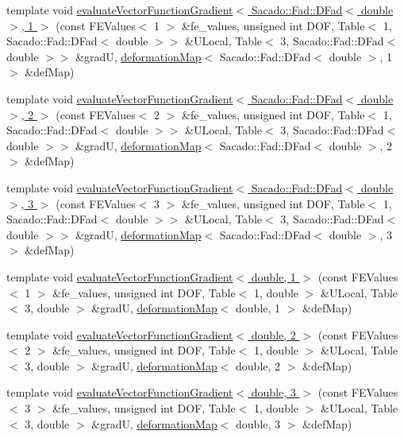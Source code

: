 \begin{DoxyCompactItemize}
\item 
template void \hyperlink{function_evaluations_8cc_a1fb7d1f43d659f0916ca96a9c951931c}{evaluate\-Vector\-Function\-Gradient$<$ Sacado\-::\-Fad\-::\-D\-Fad$<$ double $>$, 1 $>$} (const F\-E\-Values$<$ 1 $>$ \&fe\-\_\-values, unsigned int D\-O\-F, Table$<$ 1, Sacado\-::\-Fad\-::\-D\-Fad$<$ double $>$$>$ \&U\-Local, Table$<$ 3, Sacado\-::\-Fad\-::\-D\-Fad$<$ double $>$$>$ \&grad\-U, \hyperlink{structdeformation_map}{deformation\-Map}$<$ Sacado\-::\-Fad\-::\-D\-Fad$<$ double $>$, 1 $>$ \&def\-Map)
\item 
template void \hyperlink{function_evaluations_8cc_a85f7c6e4046993a83815972185df45ab}{evaluate\-Vector\-Function\-Gradient$<$ Sacado\-::\-Fad\-::\-D\-Fad$<$ double $>$, 2 $>$} (const F\-E\-Values$<$ 2 $>$ \&fe\-\_\-values, unsigned int D\-O\-F, Table$<$ 1, Sacado\-::\-Fad\-::\-D\-Fad$<$ double $>$$>$ \&U\-Local, Table$<$ 3, Sacado\-::\-Fad\-::\-D\-Fad$<$ double $>$$>$ \&grad\-U, \hyperlink{structdeformation_map}{deformation\-Map}$<$ Sacado\-::\-Fad\-::\-D\-Fad$<$ double $>$, 2 $>$ \&def\-Map)
\item 
template void \hyperlink{function_evaluations_8cc_aa336e130a0840b38bf3470c6b1133bb7}{evaluate\-Vector\-Function\-Gradient$<$ Sacado\-::\-Fad\-::\-D\-Fad$<$ double $>$, 3 $>$} (const F\-E\-Values$<$ 3 $>$ \&fe\-\_\-values, unsigned int D\-O\-F, Table$<$ 1, Sacado\-::\-Fad\-::\-D\-Fad$<$ double $>$$>$ \&U\-Local, Table$<$ 3, Sacado\-::\-Fad\-::\-D\-Fad$<$ double $>$$>$ \&grad\-U, \hyperlink{structdeformation_map}{deformation\-Map}$<$ Sacado\-::\-Fad\-::\-D\-Fad$<$ double $>$, 3 $>$ \&def\-Map)
\item 
template void \hyperlink{function_evaluations_8cc_a62dbc9fdef114b76a143e86bb1c6df96}{evaluate\-Vector\-Function\-Gradient$<$ double, 1 $>$} (const F\-E\-Values$<$ 1 $>$ \&fe\-\_\-values, unsigned int D\-O\-F, Table$<$ 1, double $>$ \&U\-Local, Table$<$ 3, double $>$ \&grad\-U, \hyperlink{structdeformation_map}{deformation\-Map}$<$ double, 1 $>$ \&def\-Map)
\item 
template void \hyperlink{function_evaluations_8cc_a2d6fafd5544183a2ed0f3190b142c853}{evaluate\-Vector\-Function\-Gradient$<$ double, 2 $>$} (const F\-E\-Values$<$ 2 $>$ \&fe\-\_\-values, unsigned int D\-O\-F, Table$<$ 1, double $>$ \&U\-Local, Table$<$ 3, double $>$ \&grad\-U, \hyperlink{structdeformation_map}{deformation\-Map}$<$ double, 2 $>$ \&def\-Map)
\item 
template void \hyperlink{function_evaluations_8cc_a05515d4765602312924bf90d040f146e}{evaluate\-Vector\-Function\-Gradient$<$ double, 3 $>$} (const F\-E\-Values$<$ 3 $>$ \&fe\-\_\-values, unsigned int D\-O\-F, Table$<$ 1, double $>$ \&U\-Local, Table$<$ 3, double $>$ \&grad\-U, \hyperlink{structdeformation_map}{deformation\-Map}$<$ double, 3 $>$ \&def\-Map)

\end{DoxyCompactItemize}
